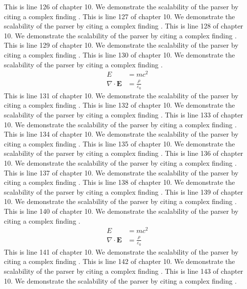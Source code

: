 This is line 126 of chapter 10. We demonstrate the scalability of the parser by citing a complex finding \cite{ref10_126}.
This is line 127 of chapter 10. We demonstrate the scalability of the parser by citing a complex finding \cite{ref10_127}.
This is line 128 of chapter 10. We demonstrate the scalability of the parser by citing a complex finding \cite{ref10_128}.
This is line 129 of chapter 10. We demonstrate the scalability of the parser by citing a complex finding \cite{ref10_129}.
This is line 130 of chapter 10. We demonstrate the scalability of the parser by citing a complex finding \cite{ref10_130}.
\begin{align*}
  E &= mc^2 \\
  \nabla \cdot \mathbf{E} &= \frac{\rho}{\varepsilon_0}
\end{align*}
This is line 131 of chapter 10. We demonstrate the scalability of the parser by citing a complex finding \cite{ref10_131}.
This is line 132 of chapter 10. We demonstrate the scalability of the parser by citing a complex finding \cite{ref10_132}.
This is line 133 of chapter 10. We demonstrate the scalability of the parser by citing a complex finding \cite{ref10_133}.
This is line 134 of chapter 10. We demonstrate the scalability of the parser by citing a complex finding \cite{ref10_134}.
This is line 135 of chapter 10. We demonstrate the scalability of the parser by citing a complex finding \cite{ref10_135}.
This is line 136 of chapter 10. We demonstrate the scalability of the parser by citing a complex finding \cite{ref10_136}.
This is line 137 of chapter 10. We demonstrate the scalability of the parser by citing a complex finding \cite{ref10_137}.
This is line 138 of chapter 10. We demonstrate the scalability of the parser by citing a complex finding \cite{ref10_138}.
This is line 139 of chapter 10. We demonstrate the scalability of the parser by citing a complex finding \cite{ref10_139}.
This is line 140 of chapter 10. We demonstrate the scalability of the parser by citing a complex finding \cite{ref10_140}.
\begin{align*}
  E &= mc^2 \\
  \nabla \cdot \mathbf{E} &= \frac{\rho}{\varepsilon_0}
\end{align*}
This is line 141 of chapter 10. We demonstrate the scalability of the parser by citing a complex finding \cite{ref10_141}.
This is line 142 of chapter 10. We demonstrate the scalability of the parser by citing a complex finding \cite{ref10_142}.
This is line 143 of chapter 10. We demonstrate the scalability of the parser by citing a complex finding \cite{ref10_143}.

